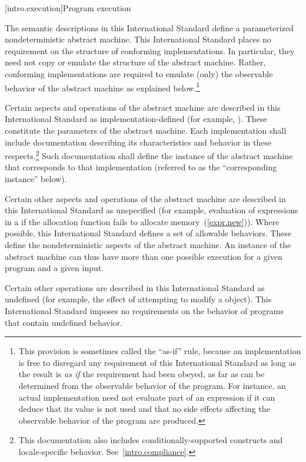 [intro.execution]{Program execution}

\pnum
{}%
%
The semantic descriptions in this International Standard define a
parameterized nondeterministic abstract machine. This International
Standard places no requirement on the structure of conforming
implementations. In particular, they need not copy or emulate the
structure of the abstract machine.
%
%
Rather, conforming implementations are required to emulate (only) the observable
behavior of the abstract machine as explained below.\footnote{This provision is
sometimes called the ``as-if'' rule, because an implementation is free to
disregard any requirement of this International Standard as long as the result
is \emph{as if} the requirement had been obeyed, as far as can be determined
from the observable behavior of the program. For instance, an actual
implementation need not evaluate part of an expression if it can deduce that its
value is not used and that no
%
side effects affecting the
observable behavior of the program are produced.}

%
\pnum
Certain aspects and operations of the abstract machine are described in this
International Standard as implementation-defined (for example,
). These constitute the parameters of the abstract machine.
Each implementation shall include documentation describing its characteristics
and behavior in these respects.\footnote{This documentation also includes
conditionally-supported constructs and locale-specific behavior.
See~\ref{intro.compliance}.} Such documentation shall define the instance of the
abstract machine that corresponds to that implementation (referred to as the
``corresponding instance'' below).

%
\pnum
Certain other aspects and operations of the abstract machine are
described in this International Standard as unspecified (for example,
evaluation of expressions in a  if the allocation
function fails to allocate memory~(\ref{expr.new})). Where possible, this
International Standard defines a set of allowable behaviors. These
define the nondeterministic aspects of the abstract machine. An instance
of the abstract machine can thus have more than one possible execution
for a given program and a given input.

%
\pnum
Certain other operations are described in this International Standard as
undefined (for example, the effect of
attempting to modify a  object).
\enternote This International Standard imposes no requirements on the
behavior of programs that contain undefined behavior. \exitnote

